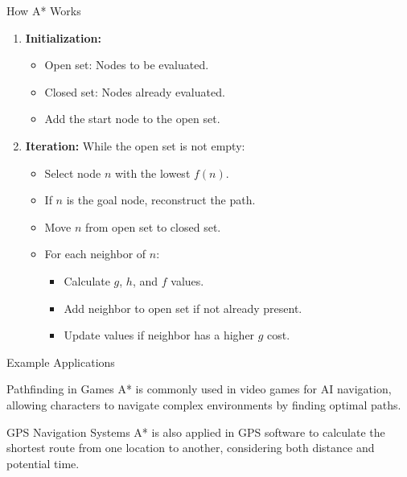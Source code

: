 \documentclass[aspectratio=169]{beamer}
\begin{document}
\begin{frame}{How A* Works}
    \begin{enumerate}
        \item \textbf{Initialization:}
            \begin{itemize}
                \item Open set: Nodes to be evaluated.
                \item Closed set: Nodes already evaluated.
                \item Add the start node to the open set.
            \end{itemize}
        
        \item \textbf{Iteration:} While the open set is not empty:
            \begin{itemize}
                \item Select node $n$ with the lowest $f(n)$.
                \item If $n$ is the goal node, reconstruct the path.
                \item Move $n$ from open set to closed set.
                \item For each neighbor of $n$:
                    \begin{itemize}
                        \item Calculate $g$, $h$, and $f$ values.
                        \item Add neighbor to open set if not already present.
                        \item Update values if neighbor has a higher $g$ cost.
                    \end{itemize}
            \end{itemize}
    \end{enumerate}
\end{frame}

\begin{frame}[fragile]{Example Applications}
    \begin{block}{Pathfinding in Games}
        A* is commonly used in video games for AI navigation, allowing characters to navigate complex environments by finding optimal paths.
    \end{block}
    
    \begin{block}{GPS Navigation Systems}
        A* is also applied in GPS software to calculate the shortest route from one location to another, considering both distance and potential time.
    \end{block}
\end{frame}
\end{document}
